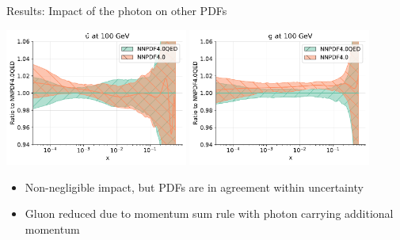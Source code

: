 \documentclass[aspectratio=169, 8pt,t]{beamer}
\begin{document}
\begin{frame}{Results: Impact of the photon on other PDFs}
  \begin{center}
    \includegraphics[width=0.45\textwidth]{figures/nnpdf40_vs_qed_ubar.pdf}
    \includegraphics[width=0.45\textwidth]{figures/nnpdf40_vs_qed_g.pdf}
  \end{center}
  \begin{itemize}
    \item Non-negligible impact, but PDFs are in agreement within uncertainty
    \item Gluon reduced due to momentum sum rule with photon carrying additional momentum
  \end{itemize}
\end{frame}
\end{document}
